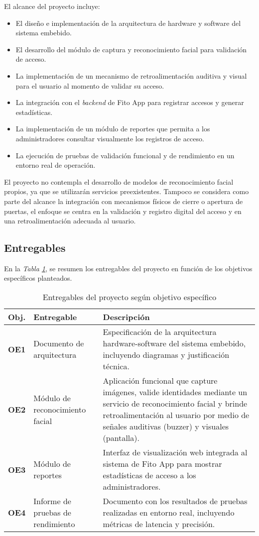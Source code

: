 El alcance del proyecto incluye:
\begin{itemize}
    \item El diseño e implementación de la arquitectura de hardware y software del sistema embebido.
    \item El desarrollo del módulo de captura y reconocimiento facial para validación de acceso.
    \item La implementación de un mecanismo de retroalimentación auditiva y visual para el usuario al momento de validar su acceso.
    \item La integración con el \textit{backend} de Fito App para registrar accesos y generar estadísticas.
    \item La implementación de un módulo de reportes que permita a los administradores consultar visualmente los registros de acceso.
    \item La ejecución de pruebas de validación funcional y de rendimiento en un entorno real de operación.
\end{itemize}

El proyecto no contempla el desarrollo de modelos de reconocimiento facial propios, ya que se utilizarán servicios preexistentes. Tampoco se considera como parte del alcance la integración con mecanismos físicos de cierre o apertura de puertas, el enfoque se centra en la validación y registro digital del acceso y en una retroalimentación adecuada al usuario.

\subsection{Entregables}
En la \textit{Tabla \ref{tab:deliverables}}, se resumen los entregables del proyecto en función de los objetivos específicos planteados.

\begin{table}[h!]
    \centering
    \begin{tabular}{p{1.5cm}|p{4.5cm}|p{8cm}}
        \hline
        \textbf{Obj.} & \textbf{Entregable} & \textbf{Descripción} \\ \hline
        \textbf{OE1} & Documento de arquitectura & Especificación de la arquitectura hardware-software del sistema embebido, incluyendo diagramas y justificación técnica. \\ \hline
        \textbf{OE2} & Módulo de reconocimiento facial & Aplicación funcional que capture imágenes, valide identidades mediante un servicio de reconocimiento facial y brinde retroalimentación al usuario por medio de señales auditivas (buzzer) y visuales (pantalla). \\ \hline
        \textbf{OE3} & Módulo de reportes & Interfaz de visualización web integrada al sistema de Fito App para mostrar estadísticas de acceso a los administradores. \\ \hline
        \textbf{OE4} & Informe de pruebas de rendimiento & Documento con los resultados de pruebas realizadas en entorno real, incluyendo métricas de latencia y precisión. \\ \hline
    \end{tabular}
    \caption{Entregables del proyecto según objetivo específico}
    \label{tab:deliverables}
\end{table}


